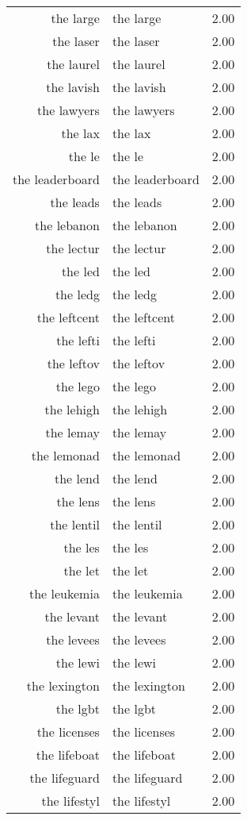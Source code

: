 \begin{table}[ht]
\begin{tabular}{rlr}
  the large & the large & 2.00 \\ 
  the laser & the laser & 2.00 \\ 
  the laurel & the laurel & 2.00 \\ 
  the lavish & the lavish & 2.00 \\ 
  the lawyers & the lawyers & 2.00 \\ 
  the lax & the lax & 2.00 \\ 
  the le & the le & 2.00 \\ 
  the leaderboard & the leaderboard & 2.00 \\ 
  the leads & the leads & 2.00 \\ 
  the lebanon & the lebanon & 2.00 \\ 
  the lectur & the lectur & 2.00 \\ 
  the led & the led & 2.00 \\ 
  the ledg & the ledg & 2.00 \\ 
  the leftcent & the leftcent & 2.00 \\ 
  the lefti & the lefti & 2.00 \\ 
  the leftov & the leftov & 2.00 \\ 
  the lego & the lego & 2.00 \\ 
  the lehigh & the lehigh & 2.00 \\ 
  the lemay & the lemay & 2.00 \\ 
  the lemonad & the lemonad & 2.00 \\ 
  the lend & the lend & 2.00 \\ 
  the lens & the lens & 2.00 \\ 
  the lentil & the lentil & 2.00 \\ 
  the les & the les & 2.00 \\ 
  the let & the let & 2.00 \\ 
  the leukemia & the leukemia & 2.00 \\ 
  the levant & the levant & 2.00 \\ 
  the levees & the levees & 2.00 \\ 
  the lewi & the lewi & 2.00 \\ 
  the lexington & the lexington & 2.00 \\ 
  the lgbt & the lgbt & 2.00 \\ 
  the licenses & the licenses & 2.00 \\ 
  the lifeboat & the lifeboat & 2.00 \\ 
  the lifeguard & the lifeguard & 2.00 \\ 
  the lifestyl & the lifestyl & 2.00 \\ 

\end{tabular}
\end{table}
